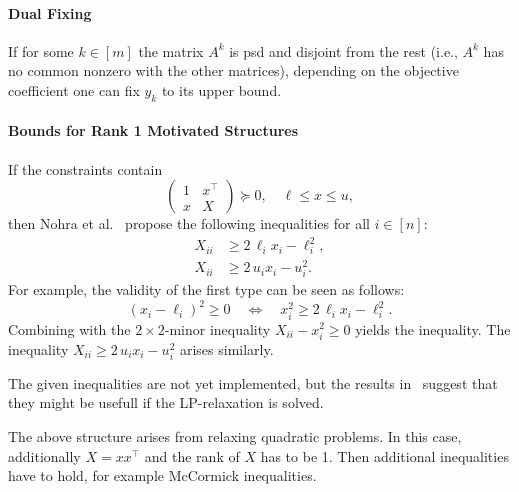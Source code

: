 \documentclass[10pt, a4paper]{article}
\newcommand{\T}{^{\top}}
\begin{document}
\paragraph{Dual Fixing}

If for some $k \in [m]$ the matrix $A^k$ is psd and disjoint from the rest
(i.e., $A^k$ has no common nonzero with the other matrices), depending on
the objective coefficient one can fix $y_k$ to its upper bound.

\paragraph{Bounds for Rank 1 Motivated Structures}

If the constraints contain
\[
  \begin{pmatrix}
    1 & x\T \\
    x & X
  \end{pmatrix}
  \succeq 0,
  \quad
  \ell \leq x \leq u,
\]
then Nohra et al.~\cite{NohRS20} propose the following inequalities for all
$i \in [n]$:
\begin{align*}
  X_{ii} & \geq 2\, \ell_i x_i - \ell_i^2,\\ 
  X_{ii} & \geq 2\, u_i x_i - u_i^2.
\end{align*}
For example, the validity of the first type can be seen as follows:
\[
  (x_i - \ell_i)^2 \geq 0 \quad\Leftrightarrow\quad x_i^2 \geq 2\,
  \ell_i x_i - \ell_i^2.
\]
Combining with the $2 \times 2$-minor inequality $X_{ii} - x_i^2 \geq 0$
yields the inequality. The inequality $X_{ii} \geq 2\, u_i x_i - u_i^2$
arises similarly.

The given inequalities are not yet implemented, but the results
in~\cite{NohRS20} suggest that they might be usefull if the LP-relaxation
is solved.

The above structure arises from relaxing quadratic problems. In this case,
additionally $X = x x\T$ and the rank of $X$ has to be 1. Then additional
inequalities have to hold, for example McCormick inequalities.
\end{document}
